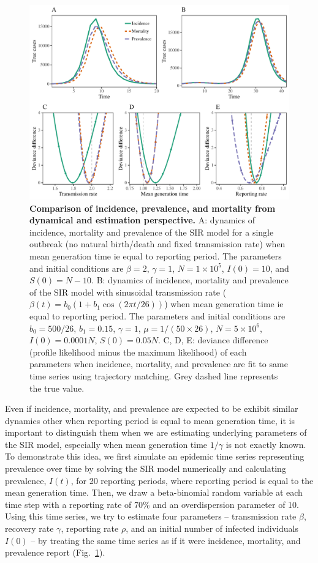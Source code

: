 \documentclass{article}
\newcommand{\fref}[1]{Fig.~\ref{fig:#1}}
\begin{document}
\begin{figure}[!ht]
\includegraphics[width=\textwidth]{../figure/compare_profile_likelihood.pdf}
\caption{
\textbf{Comparison of incidence, prevalence, and mortality from dynamical and estimation perspective.}
A: dynamics of incidence, mortality and prevalence of the SIR model for a single outbreak (no natural birth/death and fixed transmission rate) when mean generation time ie equal to reporting period.
The parameters and initial conditions are $\beta = 2$, $\gamma = 1$, $N = 1 \times 10^5$, $I(0) = 10$, and $S(0) = N - 10$.
B: dynamics of incidence, mortality and prevalence of the SIR model with sinusoidal transmission rate ($\beta(t) = b_0 (1 + b_1 \cos (2 \pi t/26))$) when mean generation time ie equal to reporting period.
The parameters and initial conditions are $b_0 = 500/26$, $b_1 = 0.15$, $\gamma = 1$, $\mu = 1/(50 \times 26)$, $N = 5 \times 10^6$, $I(0) = 0.0001 N$, $S(0) = 0.05 N$.
C, D, E: deviance difference (profile likelihood minus the maximum likelihood) of each parameters when incidence, mortality, and prevalence are fit to same time series using trajectory matching. 
Grey dashed line represents the true value.
} 
\label{fig:incidence}
\end{figure}

Even if incidence, mortality, and prevalence are expected to be exhibit similar dynamics other when reporting period is equal to mean generation time, it is important to distinguish them when we are estimating underlying parameters of the SIR model, especially when mean generation time $1/\gamma$ is not exactly known.
To demonstrate this idea, we first simulate an epidemic time series representing prevalence over time by solving the SIR model numerically and calculating prevalence, $I(t)$, for 20 reporting periods, where reporting period is equal to the mean generation time. Then, we draw a beta-binomial random variable at each time step with a reporting rate of 70\% and an overdispersion parameter of 10.
Using this time series, we try to estimate four parameters -- transmission rate $\beta$, recovery rate $\gamma$, reporting rate $\rho$, and an initial number of infected individuals $I(0)$ -- by treating the same time series as if it were incidence, mortality, and prevalence report (\fref{incidence}).
\end{document}

